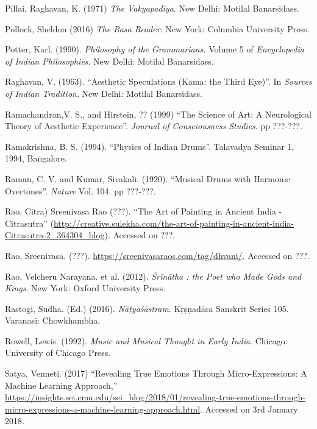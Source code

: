 \begin{thebibliography}{99}
Pillai, Raghavan, K. (1971) \textsl{The Vakyapadiya}. New Delhi: Motilal Banarsidass.

Pollock, Sheldon (2016) \textsl{The Rasa Reader}. New York: Columbia University Press.

Potter, Karl. (1990). \textsl{Philosophy of the Grammarians.} Volume 5 of \textsl{Encyclopedia of Indian Philosophies}. New Delhi: Motilal Banarsidass.

Raghavan, V. (1963). “Aesthetic Speculations (Kama: the Third Eye)”. In \textsl{Sources of Indian Tradition}. New Delhi: Motilal Banarsidass.

Ramachandran,V. S., and Hirstein, ?? (1999) “The Science of Art: A Neurological Theory of Aesthetic Experience”. \textsl{Journal of Consciousness Studies}. pp ???-???.

Ramakrishna, B. S. (1994). “Physics of Indian Drums”. Talavadya Seminar 1, 1994, Baṅgalore.

Raman, C. V. and Kumar, Sivakali. (1920). “Musical Drums with Harmonic Overtones”. \textsl{Nature} Vol. 104. pp ???-???.

Rao, Citra) Sreenivasa Rao (???). “The Art of Painting in Ancient India - Citrasutra” (\url{http://creative.sulekha.com/the-art-of-painting-in-ancient-india-Citrasutra-2_364304_blog}). Accessed on ???.

Rao, Sreenivasa. (???). \url{https://sreenivasaraos.com/tag/dhvani/}. Accessed on ???.

Rao, Velcheru Narayana. et al. (2012). \textsl{Śrīnātha : the Poet who Made Gods and Kings}. New York: Oxford University Press.

Rastogi, Sudha. (Ed.) (2016). \textsl{Nāṭyaśāstram}. Kṛṣṇadāsa Sanskrit Series 105. Varanasi: Chowkhambha.

Rowell, Lewis. (1992). \textsl{Music and Musical Thought in Early India}. Chicago: University of Chicago Press.

Satya, Venneti. (2017) “Revealing True Emotions Through Micro-Expressions: A Machine Learning Approach,” \url{https://insights.sei.cmu.edu/sei_blog/2018/01/revealing-true-emotions-through-micro-expressions-a-machine-learning-approach.html}. Accessed on 3rd January 2018.


\end{thebibliography}
